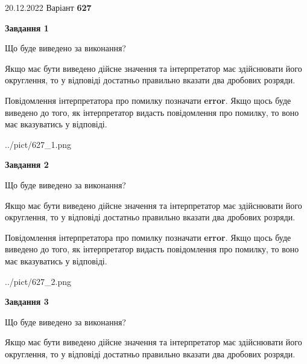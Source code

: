 \documentclass[12pt, ukrainian]{article}
\begin{document}
{20.12.2022 Варіант \No \textbf { 627 }\par}
{
\begin {Large}

{\begin {center}\textbf{Завдання 1}\end {center}}\par
Що буде виведено за виконання? \par

Якщо має бути виведено дійсне значення та інтерпретатор має здійснювати його округлення, 
то у відповіді достатньо правильно вказати два дробових розряди.

Повідомлення інтерпретатора про помилку позначати \textbf{error}.
Якщо щось буде виведено до того, як інтерпретатор видасть повідомлення про помилку, 
то воно має вказуватись у відповіді. \par

\begin{center}
	{../pict/627_1.png}
\end{center}
\newpage

{\begin {center}\textbf{Завдання 2}\end {center}}\par
Що буде виведено за виконання? \par

Якщо має бути виведено дійсне значення та інтерпретатор має здійснювати його округлення, 
то у відповіді достатньо правильно вказати два дробових розряди.

Повідомлення інтерпретатора про помилку позначати \textbf{error}.
Якщо щось буде виведено до того, як інтерпретатор видасть повідомлення про помилку, 
то воно має вказуватись у відповіді. \par

\begin{center}
	{../pict/627_2.png}
\end{center}
\newpage

{\begin {center}\textbf{Завдання 3}\end {center}}\par
Що буде виведено за виконання? \par

Якщо має бути виведено дійсне значення та інтерпретатор має здійснювати його округлення, 
то у відповіді достатньо правильно вказати два дробових розряди.


\end{Large}}
\end{document}
